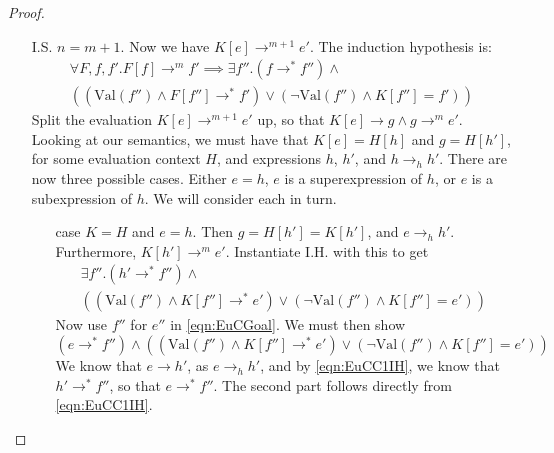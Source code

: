 \documentclass[a4paper, 11pt]{report}
\theoremstyle{definition}
\newcommand{\expr}{e}
\newcommand{\elctx}{K}
\newcommand{\step}{\rightarrow}
\newcommand{\stepS}{\rightarrow^*}
\newcommand{\hstep}{\rightarrow_h}
\newcommand{\Val}[1]{\mathrm{Val}(#1)}
\begin{document}
\begin{proof}
\begin{itemize}
    \item[I.S.] $n = m + 1$. Now we have $\elctx[\expr] \step^{m + 1} \expr'$. The induction hypothesis is:
    \begin{multline}\label{eqn:EuCIH}
      \forall F, f, f'. F[f] \step^m f' \implies \exists f'' . (f \stepS f'') \land \\
      \left( (\Val{f''} \land F[f''] \stepS f') \lor
      (\neg \Val{f''} \land \elctx[f''] = f') \right)
    \end{multline}
    Split the evaluation $\elctx[\expr] \step^{m + 1} \expr'$ up, so that 
    $\elctx[\expr] \step g \land g \step^{m} \expr'$. Looking at our semantics, we must have that $\elctx[\expr] = H[h]$ and $g = H[h']$, for some evaluation context $H$, and expressions $h$, $h'$, and $h \hstep h'$.
    There are now three possible cases. Either $\expr = h$, $\expr$ is a superexpression of $h$, or $\expr$ is a subexpression of $h$. We will consider each in turn.
    \begin{itemize}
      \item[case] $\elctx = H$ and $\expr = h$. 
        Then $g = H[h'] = \elctx[h']$, and $\expr \hstep h'$. Furthermore, $\elctx[h'] \step^m \expr'$. Instantiate I.H. with this to get
        \begin{multline}\label{eqn:EuCC1IH}
          \exists f'' . (h' \stepS f'') \land\\
          \left((\Val{f''} \land \elctx[f''] \stepS \expr') \lor
          (\neg \Val{f''} \land \elctx[f''] = \expr') \right)
        \end{multline}
        Now use $f''$ for $\expr''$ in \ref{eqn:EuCGoal}. We must then show
        \begin{equation*}
          (\expr \stepS f'') \land 
          \left( (\Val{f''} \land \elctx[f''] \stepS \expr') \lor
          (\neg \Val{f''} \land \elctx[f''] = \expr') \right)
        \end{equation*}
        We know that $\expr \step h'$, as $\expr \hstep h'$, and by 
        \ref{eqn:EuCC1IH}, we know that $h' \stepS f''$, so that $\expr \stepS f''$. The second part follows directly from \ref{eqn:EuCC1IH}.
      

\end{itemize}
\end{itemize}
\end{proof}
\end{document}

